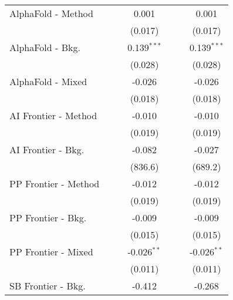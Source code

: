 \begin{tabular}{lcccccc}
   AlphaFold - Method           &              &           & 0.001          &              &           & 0.001\\   
                                &              &           & (0.017)        &              &           & (0.017)\\   
   AlphaFold - Bkg.             &              &           & 0.139$^{***}$  &              &           & 0.139$^{***}$\\   
                                &              &           & (0.028)        &              &           & (0.028)\\   
   AlphaFold - Mixed            &              &           & -0.026         &              &           & -0.026\\   
                                &              &           & (0.018)        &              &           & (0.018)\\   
   AI Frontier - Method         &              &           & -0.010         &              &           & -0.010\\   
                                &              &           & (0.019)        &              &           & (0.019)\\   
   AI Frontier - Bkg.           &              &           & -0.082         &              &           & -0.027\\   
                                &              &           & (836.6)        &              &           & (689.2)\\   
   PP Frontier - Method         &              &           & -0.012         &              &           & -0.012\\   
                                &              &           & (0.019)        &              &           & (0.019)\\   
   PP Frontier - Bkg.           &              &           & -0.009         &              &           & -0.009\\   
                                &              &           & (0.015)        &              &           & (0.015)\\   
   PP Frontier - Mixed          &              &           & -0.026$^{**}$  &              &           & -0.026$^{**}$\\   
                                &              &           & (0.011)        &              &           & (0.011)\\   
   SB Frontier - Bkg.           &              &           & -0.412         &              &           & -0.268\\   

\end{tabular}

